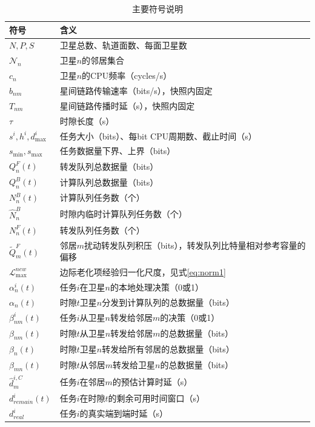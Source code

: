 \documentclass[a4paper,11pt]{article}
\begin{document}
\begin{table}[t]
\centering
\caption{主要符号说明}
\label{tab:notation}
\begin{tabular}{ll}
\toprule
\textbf{符号} & \textbf{含义} \\
\midrule
$N, P, S$ & 卫星总数、轨道面数、每面卫星数 \\
$\mathcal{N}_n$ & 卫星$n$的邻居集合 \\
$c_n$ & 卫星$n$的CPU频率（cycles/s） \\
$b_{nm}$ & 星间链路传输速率（bits/s），快照内固定 \\
$T_{nm}$ & 星间链路传播时延（s），快照内固定 \\
$\tau$ & 时隙长度（s） \\
$s^i, h^i, d^i_{\max}$ & 任务大小（bits）、每bit CPU周期数、截止时间（s） \\
$s_{\min}, s_{\max}$ & 任务数据量下界、上界（bits） \\
$Q^F_n(t)$ & 转发队列总数据量（bits） \\
$Q^B_n(t)$ & 计算队列总数据量（bits） \\
$N^B_n(t)$ & 计算队列任务数（个） \\
$\hat{N}^B_n$ & 时隙内临时计算队列任务数（个） \\
$N^F_n(t)$ & 转发队列任务数（个） \\
$\tilde{Q}^F_m(t)$ & 邻居$m$扰动转发队列积压（bits），转发队列比特量相对参考容量的偏移 \\
$\mathcal{L}^{new}_{\max}$ & 边际老化项经验归一化尺度，见式\eqref{eq:norm1} \\
$\alpha^i_n(t)$ & 任务$i$在卫星$n$的本地处理决策（0或1） \\
$\alpha_n(t)$ & 时隙$t$卫星$n$分发到计算队列的总数据量（bits） \\
$\beta^i_{nm}(t)$ & 任务$i$从卫星$n$转发给邻居$m$的决策（0或1） \\
$\beta_{nm}(t)$ & 时隙$t$从卫星$n$转发给邻居$m$的总数据量（bits） \\
$\beta_n(t)$ & 时隙$t$卫星$n$转发给所有邻居的总数据量（bits） \\
$\beta_{mn}(t)$ & 时隙$t$从邻居$m$转发给卫星$n$的总数据量（bits） \\
$\hat{d}^{i,C}_m$ & 任务$i$在邻居$m$的预估计算时延（s） \\
$d^i_{remain}(t)$ & 任务$i$在时隙$t$的剩余可用时间窗口（s） \\
$d^i_{real}$ & 任务$i$的真实端到端时延（s） \\

\end{tabular}
\end{table}
\end{document}
